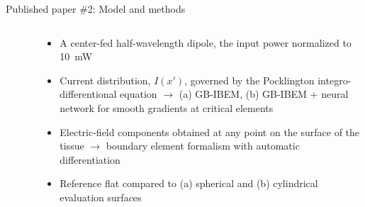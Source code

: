 \documentclass[xcolor=dvipsnames,10pt]{beamer}
\begin{document}
\begin{frame}{Published paper \#2: Model and methods}
\begin{columns}[c]
\begin{column}{0.4\textwidth}
\begin{onlyenv}
\begin{center}
\begin{figure}
                \end{figure}
                \end{center}
            \end{onlyenv}
        \end{column} 
        \begin{column}{0.6\textwidth}
            \begin{itemize}
                \item<1> A center-fed half-wavelength dipole, the input power normalized to \SI{10}{\milli\watt}
                \item<2> Current distribution, $I(x')$, governed by the Pocklington integro-differentional equation $\rightarrow$ (a) GB-IBEM, (b) GB-IBEM + neural network for smooth gradients at critical elements
                \item<3> Electric-field components obtained at any point on the surface of the tissue $\rightarrow$ boundary element formalism with automatic differentiation
                \item<4> Reference flat compared to (a) spherical and (b) cylindrical evaluation surfaces
            \end{itemize}
        \end{column}
    \end{columns}  
\end{frame}
\end{document}
